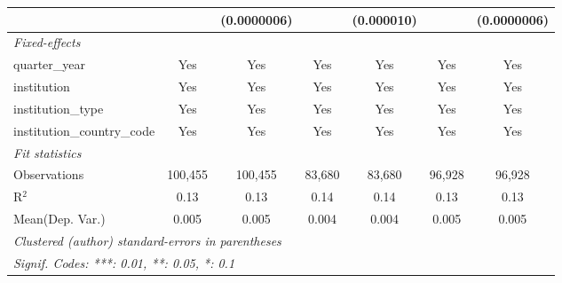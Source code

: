 \begin{tabular}{lcccccc}
                                      &               & (0.0000006)  &          & (0.000010) &               & (0.0000006)\\   
   \midrule
   \emph{Fixed-effects}\\
   quarter\_year                      & Yes           & Yes          & Yes      & Yes        & Yes           & Yes\\  
   institution                        & Yes           & Yes          & Yes      & Yes        & Yes           & Yes\\  
   institution\_type                  & Yes           & Yes          & Yes      & Yes        & Yes           & Yes\\  
   institution\_country\_code         & Yes           & Yes          & Yes      & Yes        & Yes           & Yes\\  
   \midrule
   \emph{Fit statistics}\\
   Observations                       & 100,455       & 100,455      & 83,680   & 83,680     & 96,928        & 96,928\\  
   R$^2$                              & 0.13          & 0.13         & 0.14     & 0.14       & 0.13          & 0.13\\  
Mean(Dep. Var.) & 0.005 & 0.005 & 0.004 & 0.004 & 0.005 & 0.005 \\
   \midrule \midrule
   \multicolumn{7}{l}{\emph{Clustered (author) standard-errors in parentheses}}\\
   \multicolumn{7}{l}{\emph{Signif. Codes: ***: 0.01, **: 0.05, *: 0.1}}\\
\end{tabular}
\par\endgroup
